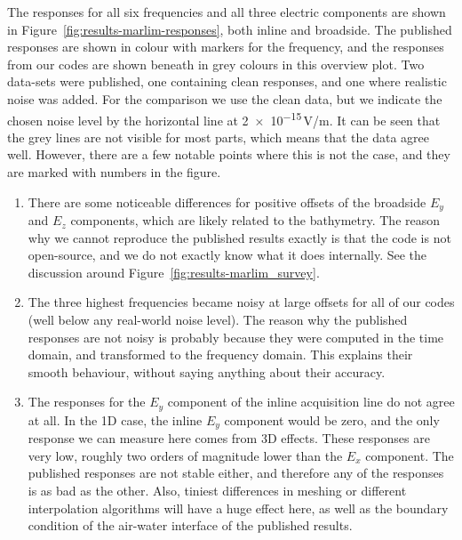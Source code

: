 \documentclass[
    paper,
  ]{geophysics}
\begin{document}
%
%

The responses for all six frequencies and all three electric components are shown in Figure~\ref{fig:results-marlim-responses}, both inline and broadside. The published responses are shown in colour with markers for the frequency, and the responses from our codes are shown beneath in grey colours in this overview plot.
%
%
Two data-sets were published, one containing clean responses, and one where realistic noise was added. For the comparison we use the clean data, but we indicate the chosen noise level by the horizontal line at \num{2e-15}\,V/m. It can be seen that the grey lines are not visible for most parts, which means that the data agree well. However, there are a few notable points where this is not the case, and they are marked with numbers in the figure.
\begin{enumerate}
  \item There are some noticeable differences for positive offsets of the broadside $E_y$ and $E_z$ components, which are likely related to the bathymetry. The reason why we cannot reproduce the published results exactly is that the code is not open-source, and we do not exactly know what it does internally. See the discussion around Figure~\ref{fig:results-marlim_survey}.
  \item The three highest frequencies became noisy at large offsets for all of our codes (well below any real-world noise level). The reason why the published responses are not noisy is probably because they were computed in the time domain, and transformed to the frequency domain. This explains their smooth behaviour, without saying anything about their accuracy.
  \item The responses for the $E_y$ component of the inline acquisition line do not agree at all. In the 1D case, the inline $E_y$ component would be zero, and the only response we can measure here comes from 3D effects. These responses are very low, roughly two orders of magnitude lower than the $E_x$ component. The published responses are not stable either, and therefore any of the responses is as bad as the other. Also, tiniest differences in meshing or different interpolation algorithms will have a huge effect here, as well as the boundary condition of the air-water interface of the published results.
\end{enumerate}
\end{document}
